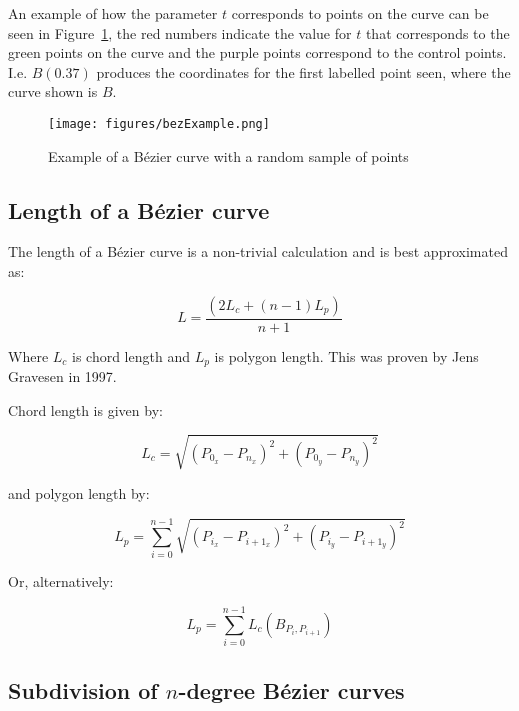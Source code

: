 An example of how the parameter $t$ corresponds to points on the curve can be seen in Figure~\ref{fig:bezexample}, the red numbers indicate the value for $t$ that corresponds to the green points on the curve and the purple points correspond to the control points. I.e. $B(0.37)$ produces the coordinates for the first labelled point seen, where the curve shown is $B$.

\begin{figure}[ht]
  \centering
  \texttt{[image: figures/bezExample.png]}
  \caption{\label{fig:bezexample} Example of a Bézier  curve with a random sample of points}
\end{figure}


\subsection{Length of a Bézier curve}
\label{subsec:back-bez-length}

The length of a Bézier curve is a non-trivial calculation and is best approximated as:

\begin{equation}
    L = \frac{(2L_c + (n-1)L_p)}{n+1}
\end{equation}

Where $L_c$ is chord length and $L_p$ is polygon length. This was proven by Jens Gravesen\cite{gravesenAdaptiveSubdivisionLength1997} in 1997.

Chord length is given by:

\begin{equation}\label{eq:bezlength}
  L_{c} = \sqrt{\left(P_{0_{x}} - P_{n_{x}}\right)^{2} + \left(P_{0_{y}} - P_{n_{y}}\right)^{2}}
\end{equation}

and polygon length by:

\begin{equation}
  L_{p} = \sum_{i=0}^{n-1} \sqrt{\left(P_{i_{x}} - P_{i+1_{x}}\right)^{2} + \left(P_{i_{y}} - P_{i+1_{y}}\right)^{2}}
\end{equation}

Or, alternatively:

\begin{equation}
  L_{p} = \sum_{i=0}^{n-1} L_{c}(B_{P_{i},P_{i+1}})
\end{equation}

\subsection{Subdivision of $n$-degree Bézier curves}
\label{sec:decasteljau}


